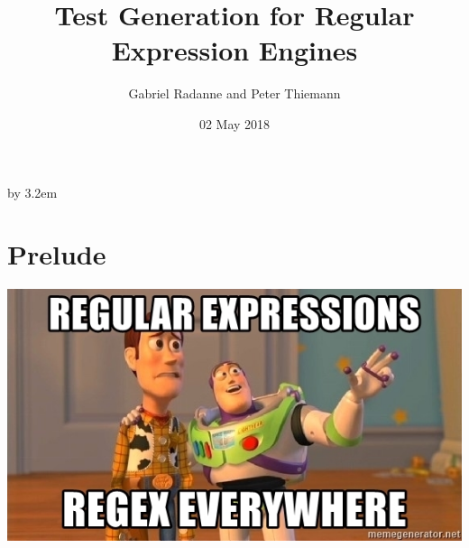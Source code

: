 \documentclass[pdftex,aspectratio=169]{beamer}
\begin{document}
\everymath{\displaystyle}


\title{Test Generation for Regular Expression Engines}
\author[Thiemann]%
{Gabriel Radanne and Peter Thiemann}
\date[2018-05-02]{02 May 2018}

\makeatletter
\begin{frame}[plain,label=fp]
    \advance\textwidth by 3.2em\relax
    \begin{minipage}{\textwidth}\par%
      \maketitle
    \end{minipage}
    \hspace*{2.5em}%
\end{frame}
\makeatother 

\section{Prelude}

\begin{frame}
    \begin{center}
      \includegraphics[scale=0.8]{regular-expressions-regex-everywhere}
    \end{center}
\end{frame}
\end{document}
